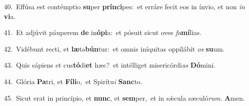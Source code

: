 {\numbfont\textcolor{\numbcolor}{40.}}~Effúsa est contémptio \textbf{su}\-per \textbf{prín}\-\textbf{ci}pes:~\star et erráre fecit eos in ínvio, et non \textit{in} \textbf{vi}\-a.\par
{\numbfont\textcolor{\numbcolor}{41.}}~Et adjúvit páuperem \textbf{de} in\-\textbf{ó}\-\textbf{pi}a:~\star et pósuit sicut oves \textit{fa}\-\textbf{mí}lias.\par
{\numbfont\textcolor{\numbcolor}{42.}}~Vidébunt recti, et \textbf{læ}\-ta\-\textbf{bún}\-tur:~\star et omnis iníquitas oppilábit \textit{os} \textbf{su}\-um.\par
{\numbfont\textcolor{\numbcolor}{43.}}~Quis sápiens et cus\-\textbf{tó}\-di\textbf{et} hæc?~\star et intélliget misericórdi\textit{as} \textbf{Dó}\-mini.\par
{\numbfont\textcolor{\numbcolor}{44.}}~Glória \textbf{Pa}\-tri, et \textbf{Fí}\-\textbf{li}o,~\star et Spirítu\textit{i} \textbf{Sanc}\-to.\par
{\numbfont\textcolor{\numbcolor}{45.}}~Sicut erat in princípio, et \textbf{nunc}\-, et \textbf{sem}\-per,~\star et in sǽcula sæculó\-\textit{rum}\-. \textbf{A}\-men.\par

